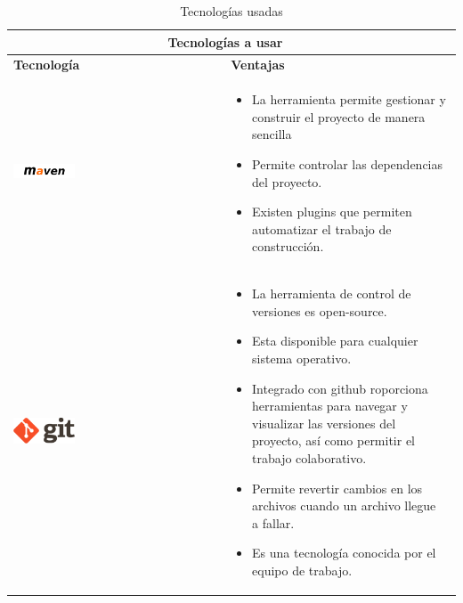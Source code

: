   \newpage
    \begin{table}[b!]
    \centering
    \vspace{33mm}
      \begin{tabular}{|p{2cm}|ll}
        \hline
        \multicolumn{2}{|c|}{{\bf Tecnologías a usar}} \\ 
        \hline
          \multicolumn{1}{|p{4cm}|}{{\bf Tecnología}} & 
		  \multicolumn{1}{p{10cm}|}{{\bf Ventajas}}\\
        \hline
          \multicolumn{1}{|p{5cm}|}{\includegraphics[width=0.3\textwidth]{images/maven}} & 
          \multicolumn{2}{p{10cm}|}{\begin{itemize}
          \vspace{-5mm}
         \item La herramienta permite gestionar y construir el proyecto de manera sencilla
         \item Permite controlar las dependencias del proyecto.
         \item Existen plugins que permiten automatizar el trabajo de construcción.
      \end{itemize}} \\
        \hline
          \multicolumn{1}{|p{5cm}|}{\includegraphics[width=0.3\textwidth]{images/git}} & 
          \multicolumn{1}{p{10cm}|}{
          \begin{itemize}
          \vspace{-15mm}
        \item La herramienta de control de versiones es open-source.
        \item Esta disponible para cualquier sistema operativo.
		    \item Integrado con github roporciona herramientas para navegar y visualizar las versiones del proyecto, así como permitir el trabajo colaborativo.
		    \item Permite revertir cambios en los archivos cuando un archivo llegue a fallar.
        \item Es una tecnología conocida por el equipo de trabajo.
      \end{itemize}} \\ 
      
        \hline
      \end{tabular}
      \caption{Tecnologías usadas}
      \label{table: tecnologias usadas}
    \end{table}


